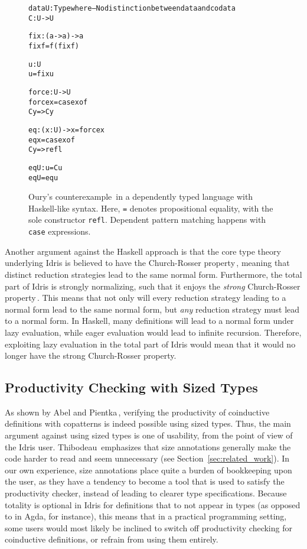 \begin{figure}
\begin{alltt}
data U : Type where         -- No distinction between data and codata
  C : U -> U

fix : (a -> a) -> a
fix f = f (fix f)

u : U
u = fix u

force : U -> U
force x = case x of
            C y => C y

eq : (x : U) -> x = force x
eq x = case x of
         C y => refl

eqU : u = C u
eqU = eq u
\end{alltt}
\caption{Oury's counterexample\,\citep{OuryCounterexample} in a dependently typed language with Haskell-like syntax. Here, \texttt{=} denotes propositional equality, with the sole constructor \texttt{refl}. Dependent pattern matching happens with \texttt{case} expressions.}
\label{fig:subject_reduction_problem}
\end{figure}

Another argument against the Haskell approach is that the core type theory underlying Idris is believed to have the Church-Rosser property\,\citep{BradyIdrisImpl13}, meaning that distinct reduction strategies lead to the same normal form. Furthermore, the total part of Idris is strongly normalizing, such that it enjoys the \emph{strong} Church-Rosser property\,\citep{Turner04totalfunctional}. This means that not only will every reduction strategy leading to a normal form lead to the same normal form, but \emph{any} reduction strategy must lead to a normal form. In Haskell, many definitions will lead to a normal form under lazy evaluation, while eager evaluation would lead to infinite recursion. Therefore, exploiting lazy evaluation in the total part of Idris would mean that it would no longer have the strong Church-Rosser property.

\subsection{Productivity Checking with Sized Types}
As shown by Abel and Pientka\,\citep{Abel13Wellfounded}, verifying the productivity of coinductive definitions with copatterns is indeed possible using sized types. Thus, the main argument against using sized types is one of usability, from the point of view of the Idris user. Thibodeau\,\citep{Thibodeau11} emphasizes that size annotations generally make the code harder to read and seem unnecessary (see Section~\ref{sec:related_work}). In our own experience, size annotations place quite a burden of bookkeeping upon the user, as they have a tendency to become a tool that is used to satisfy the productivity checker, instead of leading to clearer type specifications. Because totality is optional in Idris for definitions that to not appear in types (as opposed to in Agda, for instance), this means that in a practical programming setting, some users would most likely be inclined to switch off productivity checking for coinductive definitions, or refrain from using them entirely.

